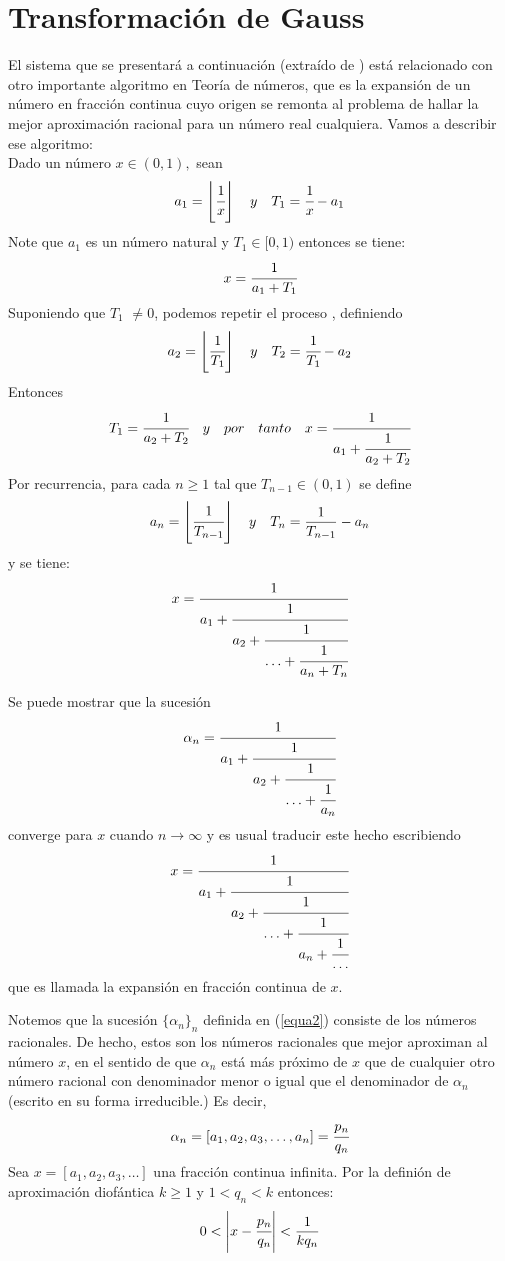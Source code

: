 \section{Transformación de Gauss}
El sistema que se presentará a continuación (extraído de \cite{Viana}) está relacionado con otro importante algoritmo en Teoría de números, que es la expansión de un número en fracción continua cuyo origen se remonta al problema de hallar la mejor aproximación racional para un número real cualquiera. Vamos a describir ese algoritmo:\\

Dado un número $x \in(0,1),$ sean
\[
a_{1}=\left\lfloor\cfrac{1}{x}\right\rfloor \quad y \quad T_{1}=\cfrac{1}{x}-a_{1}
\]
Note que $a_{1}$ es un número natural y $T_{1} \in[0,1)$ entonces se tiene:
\[
x=\cfrac{1}{a_{1}+T_{1}}
\]
Suponiendo que $T_{1}$ $\neq 0$, podemos repetir el proceso , definiendo
\[
a_{2}=\left\lfloor\cfrac{1}{T_{1}}\right\rfloor \quad y \quad T_{2}=\cfrac{1}{T_{1}}-a_{2}
\]
Entonces 
\[
T_{1}=\cfrac{1}{a_{2}+T_{2}} \quad y \quad por \quad tanto \quad x=\cfrac{1}{a_{1}+\cfrac{1}{a_{2}+T_{2}}}
\]
Por recurrencia, para cada $n \geqslant 1$ tal que $T_{n-1} \in(0,1)$ se define
\[
a_{n}=\left\lfloor\cfrac{1}{T_{n-1}}\right\rfloor \quad y \quad T_{n}=\frac{1}{T_{n-1}}-a_{n}
\]
y se tiene: 
\begin{equation}
    x=\cfrac{1}{a_{1}+\cfrac{1}{a_{2}+\cfrac{1}{\ldots+\cfrac{1}{a_{n}+
    T_{n}}}}}
    \label{equa1}
\end{equation}

Se puede mostrar que la sucesión
\begin{equation}
    \alpha_{n} = \cfrac{1}{a_{1}+\cfrac{1}{a_{2}+\cfrac{1}{\ldots+\cfrac{1}{a_{n}}}}}
    \label{equa2}
\end{equation}
converge para $x$ cuando $n\to\infty$ y es usual traducir este hecho escribiendo
\begin{equation}
    x=\cfrac{1}{a_{1}+\cfrac{1}{a_{2}+\cfrac{1}{\ldots+\cfrac{1}{a_{n}+\cfrac{1}{\ldots}}}}}
    \label{equa3}
\end{equation}
que es llamada la expansión en fracción continua de $x$.

\begin{obs}
Notemos que la sucesión $\{\alpha_{n}\}_{n}$ definida en (\ref{equa2}) consiste de los números racionales. De hecho, estos son los números racionales que mejor aproximan al número $x$, en el sentido de que $\alpha_{n}$ está más próximo de $x$ que de cualquier otro número racional con denominador menor o igual que el denominador de $\alpha_{n}$ (escrito en su forma irreducible.)
Es decir,
$$
\alpha_{n}=[a_{1},a_{2},a_{3},\ldots,a_{n}]=\cfrac{p_{n}}{q_{n}}
$$
Sea $x=[a_{1},a_{2},a_{3},\ldots]$ una fracción continua infinita. Por la definión de aproximación diofántica $k\geq1$ y $1<q_{n}<k$ entonces:
$$
0<\left|x-\cfrac{p_{n}}{q_{n}}\right|<\frac{1}{kq_{n}}
$$
\end{obs}

